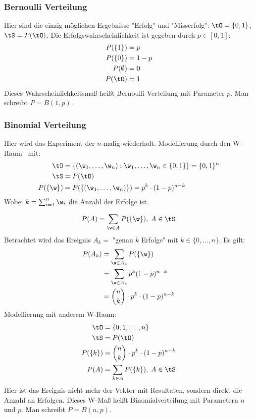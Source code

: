 \subsubsection{Bernoulli Verteilung}
\label{sec:bernoulli}
Hier sind die einzig möglichen Ergebnisse "Erfolg" und "Misserfolg":
$\tO = \{ 0,1 \}$, $\tS = P(\tO)$.
Die Erfolgswahrscheinlichkeit ist gegeben durch $p \in [0,1]$:
\begin{align*}
    P(\{1\})     & = p   \\
    P(\{0\})     & = 1-p \\
    P(\emptyset) & = 0   \\
    P(\tO)       & = 1
\end{align*}
Dieses Wahrscheinlichkeitsmaß heißt Bernoulli Verteilung mit Parameter $p$.
Man schreibt $P=B(1,p)$.

\subsubsection{Binomial Verteilung}
Hier wird das Experiment der  $n$-malig wiederholt.
Modellierung durch den W-Raum \wraum\ mit:
\begin{align*}
    \tO       & = \left\{ (\w_1, \dots , \w_n): \w_1, \dots , \w_n \in \{0,1\} \right\} = \{0,1\}^n \\
    \tS       & = P(\tO)                                                                            \\
    P(\{\w\}) & = P(\{(\w_1, \dots , \w_n)\}) = p^k \cdot (1-p)^{n-k}
\end{align*}
Wobei $k=\sum_{i=1}^n \w_i$ die Anzahl der Erfolge ist.

\begin{equation*}
    P(A) = \sum_{\w \in A} P(\{\w\}), \; A \in \tS
\end{equation*}
Betrachtet wird das Ereignis $A_k =$ "genau $k$ Erfolge" mit $k \in \{0, \dots , n\}$.
Es gilt:
\begin{align*}
    P(A_k) & = \sum_{\w \in A_k} P(\{ \w \})            \\
           & = \sum_{\w \in A_k} p^k (1-p)^{n-k}        \\
           & = \binom{n}{k} \cdot p^k \cdot (1-p)^{n-k}
\end{align*}
Modellierung mit anderem W-Raum:
\begin{align*}
    \tO      & = \{0,1,\dots ,n\}                         \\
    \tS      & = P(\tO)                                   \\
    P(\{k\}) & = \binom{n}{k} \cdot p^k \cdot (1-p)^{n-k} \\
    P(A)     & = \sum_{k \in A} P(\{k\}), \; A \in \tS
\end{align*}
Hier ist das Ereignis nicht mehr der Vektor mit Resultaten,
sondern direkt die Anzahl an Erfolgen.
Dieses W-Maß heißt Binomialverteilung mit Parametern $n$ und $p$.
Man schreibt $P = B(n,p)$.
